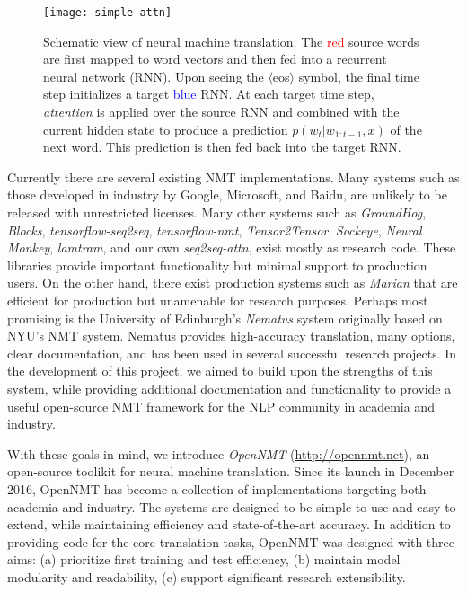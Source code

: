 \documentclass[]{article}
\begin{document}
\begin{figure}
  \centering
  \texttt{[image: simple-attn]}
  \label{fig:rnn}
  \caption{\small Schematic view of neural machine translation. The \textcolor{red}{red} source words are first mapped to word vectors and then fed into a recurrent neural network (RNN). Upon seeing the $\langle$eos$\rangle$ symbol, the final time step initializes a target \textcolor{blue}{blue} RNN. At each target time step, \textit{attention} is applied over the source RNN and combined with the current hidden state to produce a prediction $p(w_t| w_{1: t-1}, x)$ of the next word. This prediction is then fed back into the target RNN.}
\end{figure}


Currently there are several existing NMT implementations. Many systems
such as those developed in industry by Google, Microsoft, and Baidu, are unlikely to be released with unrestricted
licenses. Many other systems such as \textit{GroundHog},
\textit{Blocks}, \textit{tensorflow-seq2seq}, \textit{tensorflow-nmt}, \textit{Tensor2Tensor}, \textit{Sockeye}, \textit{Neural Monkey}, \textit{lamtram}, and
our own \textit{seq2seq-attn}, exist mostly as research code. These
libraries provide important functionality but minimal support to
production users. On the other hand, there exist production systems such as \textit{Marian} that are efficient for production but unamenable for research purposes. Perhaps most promising is the University of
Edinburgh's \textit{Nematus} system originally based on NYU's NMT
system. Nematus provides high-accuracy translation, many options,
clear documentation, and has been used in several successful research
projects. In the development of this project, we aimed to build upon
the strengths of this system, while providing additional documentation
and functionality to provide a useful open-source NMT framework for
the NLP community in academia and industry.

With these goals in mind, we introduce \textit{OpenNMT}
(\url{http://opennmt.net}), an open-source toolikit for neural machine translation. Since its launch in December 2016, OpenNMT has become a collection of implementations targeting both academia and industry. The systems are designed to be simple to use and easy to extend, while maintaining efficiency and state-of-the-art accuracy. In
addition to providing code for the core translation tasks, OpenNMT was
designed with three aims: (a) prioritize first training and test
efficiency, (b) maintain model modularity and readability, (c) support
significant research extensibility.
\end{document}
